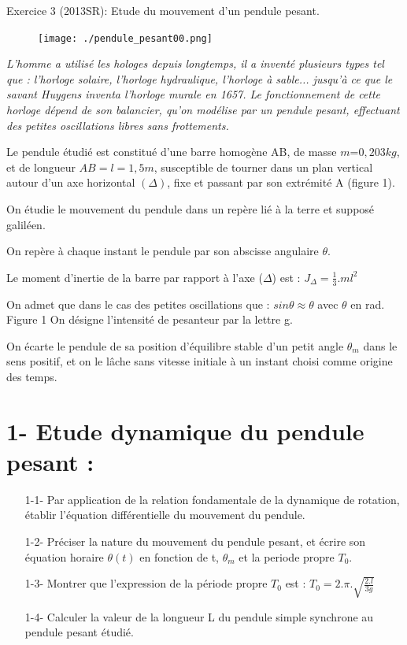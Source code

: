 \documentclass[12pt, french]{article}
\begin{document}
\begin{Box2}{Exercice 3 (2013SR): Etude du mouvement d’un pendule pesant. }
   
  \begin{figure}
  \begin{center}
	  \vspace{-0.6cm}
	\texttt{[image: ./pendule\_pesant00.png]}
  \end{center}
\end{figure}
  \emph{L’homme a utilisé les hologes depuis longtemps, il a inventé plusieurs types tel que :
l’horloge solaire, l’horloge hydraulique, l’horloge à sable... jusqu’à ce que le savant
Huygens inventa l’horloge murale en 1657.
Le fonctionnement de cette horloge dépend de son balancier, qu’on modélise par un
pendule pesant, effectuant des petites oscillations libres sans frottements.}

Le pendule étudié est constitué d’une barre homogène
AB, de masse $m $=$0,203 kg$, et de longueur
$AB = l = 1,5 m$, susceptible de tourner dans un plan
vertical autour d’un axe horizontal $(\Delta)$, fixe et passant
par son extrémité A (figure 1).

On étudie le mouvement du pendule dans un repère lié à
la terre et supposé galiléen.

  On repère à chaque instant le pendule par son abscisse
angulaire $\theta$.

Le moment d’inertie de la barre par rapport à l’axe ($\Delta$)
  est : $J_{\Delta} = \frac{1}{3}.ml^2$

  On admet que dans le cas des petites oscillations que :
$sin\theta \approx \theta$ avec $\theta$ en rad. Figure 1
On désigne l’intensité de pesanteur par la lettre g.

On écarte le pendule de sa position d’équilibre stable d’un petit angle $\theta_m$ dans le sens
positif, et on le lâche sans vitesse initiale à un instant choisi comme origine des temps.
  \section*{1- Etude dynamique du pendule pesant :}
  \begin{enumerate}
    \item[1-1-] Par application de la relation fondamentale de la dynamique de rotation,
établir l’équation différentielle du mouvement du pendule.
\item[1-2-] Préciser la nature du mouvement du pendule pesant, et écrire son équation
horaire $\theta(t)$ en fonction de t, $\theta_m$ et la periode propre $T_0$.
\item[1-3-] Montrer que l’expression de la période propre $T_0$ est : $T_0 = 2.\pi.\sqrt{\frac{2.l}{3g}}$
\item[1-4-] Calculer la valeur de la longueur L du pendule simple synchrone au
pendule pesant étudié.
  \end{enumerate}


\end{Box2}
\end{document}
